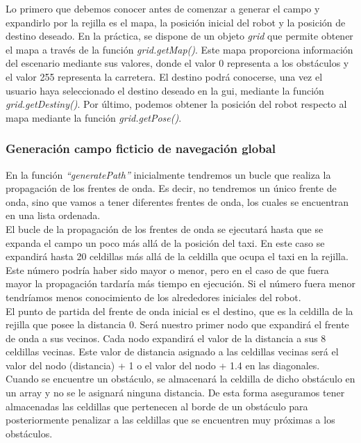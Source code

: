 Lo primero que debemos conocer antes de comenzar a generar el campo y expandirlo por la rejilla es el mapa, la posición inicial del robot y la posición de destino deseado. En la práctica, se dispone de un objeto \textit{grid} que permite obtener el mapa a través de la función \textit{grid.getMap()}. Este mapa proporciona información del escenario mediante sus valores, donde el valor 0 representa a los obstáculos y el valor 255 representa la carretera. El destino podrá conocerse, una vez el usuario haya seleccionado el destino deseado en la \acrshort{gui}, mediante la función \textit{grid.getDestiny()}. Por último, podemos obtener la posición del robot respecto al mapa mediante la función \textit{grid.getPose()}.

\subsubsection{Generación campo ficticio de navegación global}
En la función \textit{``generatePath''} inicialmente tendremos un bucle que realiza la propagación de los frentes de onda. Es decir, no tendremos un único frente de onda, sino que vamos a tener diferentes frentes de onda, los cuales se encuentran en una lista ordenada. \\

El bucle de la propagación de los frentes de onda se ejecutará hasta que se expanda el campo un poco más allá de la posición del taxi. En este caso se expandirá hasta 20 celdillas más allá de la celdilla que ocupa el taxi en la rejilla. Este número podría haber sido mayor o menor, pero en el caso de que fuera mayor la propagación tardaría más tiempo en ejecución. Si el número fuera menor tendríamos menos conocimiento de los alrededores iniciales del robot.\\

El punto de partida del frente de onda inicial es el destino, que es la celdilla de la rejilla que posee la distancia 0. Será nuestro primer nodo que expandirá el frente de onda a sus vecinos. Cada nodo expandirá el valor de la distancia a sus 8 celdillas vecinas. Este valor de distancia asignado a las celdillas vecinas será el valor del nodo (distancia) + 1 o el valor del nodo + 1.4 en las diagonales. Cuando se encuentre un obstáculo, se almacenará la celdilla de dicho obstáculo en un array y no se le asignará ninguna distancia. De esta forma aseguramos tener almacenadas las celdillas que pertenecen al borde de un obstáculo para posteriormente penalizar a las celdillas que se encuentren muy próximas a los obstáculos.\\

